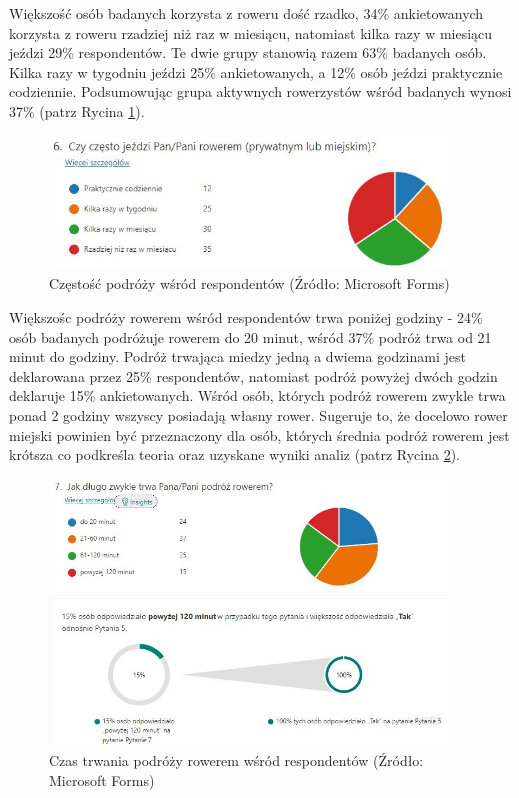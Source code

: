 \documentclass{amuthesis}
\begin{document}
Większość osób badanych korzysta z roweru dość rzadko, 34\% ankietowanych korzysta z roweru rzadziej niż raz w miesiącu, natomiast kilka razy w miesiącu jeździ 29\% respondentów.
Te dwie grupy stanowią razem 63\% badanych osób.
Kilka razy w tygodniu jeździ 25\% ankietowanych, a 12\% osób jeździ praktycznie codziennie.
Podsumowując grupa aktywnych rowerzystów wśród badanych wynosi 37\% (patrz Rycina \ref{fig:ankieta6}).

\begin{figure}[t]

{\centering \includegraphics[width=400px]{figures/ankieta/6} 

}

\caption{Częstość podróży wśród respondentów (Źródło: Microsoft Forms)}\label{fig:ankieta6}
\end{figure}

Większośc podróży rowerem wśród respondentów trwa poniżej godziny - 24\% osób badanych podróżuje rowerem do 20 minut, wśród 37\% podróż trwa od 21 minut do godziny.
Podróż trwająca miedzy jedną a dwiema godzinami jest deklarowana przez 25\% respondentów, natomiast podróż powyżej dwóch godzin deklaruje 15\% ankietowanych.
Wśród osób, których podróż rowerem zwykle trwa ponad 2 godziny wszyscy posiadają własny rower. Sugeruje to, że docelowo rower miejski powinien być przeznaczony dla osób, których średnia podróż rowerem jest krótsza co podkreśla teoria oraz uzyskane wyniki analiz (patrz Rycina \ref{fig:ankieta7}).

\begin{figure}[t]

{\centering \includegraphics[width=400px]{figures/ankieta/7} 

}

\caption{Czas trwania podróży rowerem wśród respondentów (Źródło: Microsoft Forms)}\label{fig:ankieta7}
\end{figure}
\end{document}
